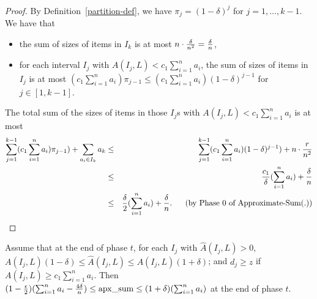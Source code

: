 \documentclass[runningheads]{llncs}
\newcommand{\appsum}{{\rm apx\_sum}}
\begin{document}
\begin{proof} By Definition~\ref{partition-def}, we have
$\pi_j=(1-\delta)^j$ for $j=1,\ldots ,k-1$. We have that
\begin{itemize}
\item
the sum of sizes of items in $I_k$ is at most $n\cdot {\delta\over
n^2}={\delta\over n}$,
\item
for each interval $I_j$ with $A(I_j, L)< c_1\sum_{i=1}^n a_i$, the
sum of sizes of items in $I_j$ is at most $(c_1\sum_{i=1}^n
a_i)\pi_{j-1}\le (c_1\sum_{i=1}^n a_i)(1-\delta)^{j-1}$ for $j\in
[1,k-1]$.
\end{itemize}
The total sum of the sizes of items in those $I_j$s with $A(I_j, L)<
c_1\sum_{i=1}^n a_i$  is at most
\begin{eqnarray*}
\sum_{j=1}^{k-1}(c_1\sum_{i=1}^n a_i)\pi_{j-1})+\sum_{a_i\in I_k}a_k
&\le& \sum_{j=1}^{k-1}(c_1\sum_{i=1}^n a_i)(1-\delta)^{j-1})+n\cdot
{r\over
n^2}\\
&\le& {c_1\over \delta}(\sum_{i=1}^n a_i)+{\delta\over n}\\
&\le& { \delta\over 2}(\sum_{i=1}^n a_i)+{\delta\over n}.   \ \ \ \
\ \mbox{(by\ Phase\ 0\ of\ Approximate-Sum(.))}
\end{eqnarray*}
\end{proof}



\begin{lemma}\label{lemma.4}
Assume that at the end of phase $t$, for each $I_j$ with
$\hat{A}(I_j,L)>0$, ${A(I_j,L) (1-\delta)}\le \hat{A}(I_j,L)\le
{A(I_j,L)(1+\delta)}$; and $d_j\ge z$ if $A(I_j,L)\ge
c_1\sum_{i=1}^na_i$. Then $(1-{\epsilon\over
2})(\sum_{i=1}^na_i-{4\delta\over n})\le \appsum\le
(1+\delta)(\sum_{i=1}^na_i)$ at the end of phase $t$.
\end{lemma}
\end{document}
